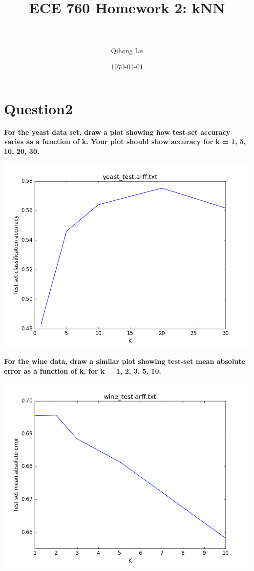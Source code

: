 \documentclass[paper=a4, fontsize=11pt]{scrartcl} %
\title{	
\normalfont \normalsize 
\horrule{0.5pt} \\[0.4cm] %
\huge ECE 760 Homework 2: kNN\\ %
\horrule{2pt} \\[0.5cm] %
}
\author{Qihong Lu} %
\date{\normalsize\today} %
\numberwithin{equation}{section} %
\numberwithin{figure}{section} %
\numberwithin{table}{section} %
\begin{document}
\maketitle %


\section*{Question2}

\textbf{For the yeast data set, draw a plot showing how test-set accuracy varies as a function of k. Your plot should show accuracy for k = 1, 5, 10, 20, 30.}
\begin{center}
\includegraphics[scale=.5]{pics/hw2_2_1.png}
\end{center}


\newpage

\textbf{For the wine data, draw a similar plot showing test-set mean absolute error as a function of k, for k = 1, 2, 3, 5, 10.}
\begin{center}
\includegraphics[scale=.5]{pics/hw2_2_2.png}
\end{center}
\end{document}
